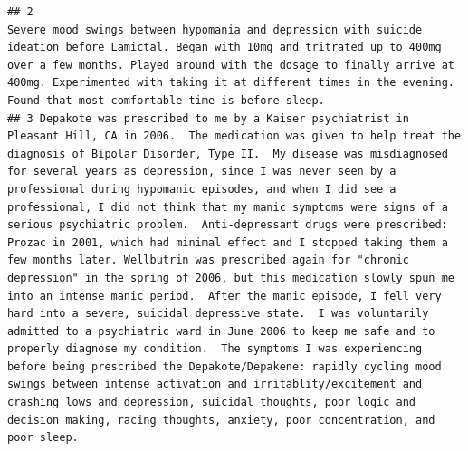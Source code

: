 \documentclass[spanish,]{article}
\begin{document}
\begin{verbatim}
## 2                                                                                                                                                                                                                                                                                                                                                                                                                                                                                                                                                                                                                                                                                                                                                                                                                                                                                                                Severe mood swings between hypomania and depression with suicide ideation before Lamictal. Began with 10mg and tritrated up to 400mg over a few months. Played around with the dosage to finally arrive at 400mg. Experimented with taking it at different times in the evening. Found that most comfortable time is before sleep.
## 3 Depakote was prescribed to me by a Kaiser psychiatrist in Pleasant Hill, CA in 2006.  The medication was given to help treat the diagnosis of Bipolar Disorder, Type II.  My disease was misdiagnosed for several years as depression, since I was never seen by a professional during hypomanic episodes, and when I did see a professional, I did not think that my manic symptoms were signs of a serious psychiatric problem.  Anti-depressant drugs were prescribed: Prozac in 2001, which had minimal effect and I stopped taking them a few months later. Wellbutrin was prescribed again for "chronic depression" in the spring of 2006, but this medication slowly spun me into an intense manic period.  After the manic episode, I fell very hard into a severe, suicidal depressive state.  I was voluntarily admitted to a psychiatric ward in June 2006 to keep me safe and to properly diagnose my condition.  The symptoms I was experiencing before being prescribed the Depakote/Depakene: rapidly cycling mood swings between intense activation and irritablity/excitement and crashing lows and depression, suicidal thoughts, poor logic and decision making, racing thoughts, anxiety, poor concentration, and poor sleep.

\end{verbatim}
\end{document}
